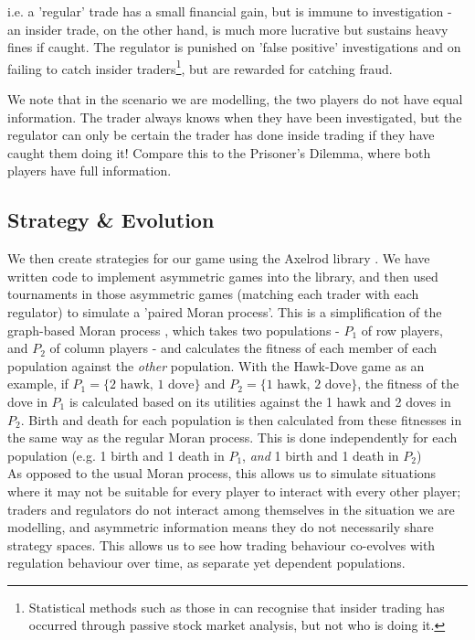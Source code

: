 \documentclass{article}
\begin{document}
i.e. a 'regular' trade has a small financial gain, but is immune to investigation - an insider trade, on the other hand, is much more lucrative but sustains heavy fines if caught. The regulator is punished on 'false positive' investigations and on failing to catch insider traders\footnote[2]{Statistical methods such as those in \citet{bris2005insider} can recognise that insider trading has occurred through passive stock market analysis, but not who is doing it.}, but are rewarded for catching fraud. 

We note that in the scenario we are modelling, the two players do not have equal information. The trader always knows when they have been investigated, but the regulator can only be certain the trader has done inside trading if they have caught them doing it! Compare this to the Prisoner's Dilemma, where both players have full information.

\subsection{Strategy \& Evolution}
We then create strategies for our game using the Axelrod library \citep{axelrodproject}. We have written code to implement asymmetric games into the library, and then used tournaments in those asymmetric games (matching each trader with each regulator) to simulate a 'paired Moran process'. This is a simplification of the graph-based Moran process \citep{shakarian2013novel}, which takes two populations - $P_1$ of row players, and $P_2$ of column players - and calculates the fitness of each member of each population against the \emph{other} population. With the Hawk-Dove game as an example, if $P_1 = \{\text{2 hawk, 1 dove}\}$ and $P_2 = \{\text{1 hawk, 2 dove}\}$, the fitness of the dove in $P_1$ is calculated based on its utilities against the 1 hawk and 2 doves in $P_2$. Birth and death for each population is then calculated from these fitnesses in the same way as the regular Moran process. This is done independently for each population (e.g. 1 birth and 1 death in $P_1$, \emph{and} 1 birth and 1 death in $P_2$)
\\

As opposed to the usual Moran process, this allows us to simulate situations where it may not be suitable for every player to interact with every other player; traders and regulators do not interact among themselves in the situation we are modelling, and asymmetric information means they do not necessarily share strategy spaces. This allows us to see how trading behaviour co-evolves with regulation behaviour over time, as separate yet dependent populations.
\end{document}
